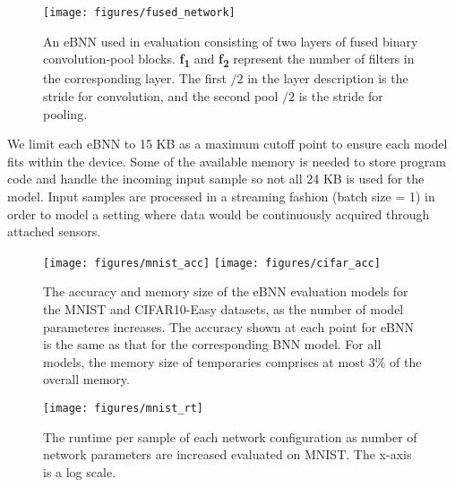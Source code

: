 \documentclass[10pt,emptycopyrightspace]{ewsn-proc}
\begin{document}
\begin{figure}
  \begin{minipage}[ht!]{0.25\linewidth}
    \texttt{[image: figures/fused\_network]}
  \end{minipage}\hfill
  \begin{minipage}[c]{0.7\linewidth}
    \caption{An eBNN used in evaluation consisting of two layers of fused binary convolution-pool blocks. \textbf{f\textsubscript{1}} and \textbf{f\textsubscript{2}} represent the number of filters in the corresponding layer. The first $/2$ in the layer description is the stride for convolution, and the second pool $/2$ is the stride for pooling.} \label{fig:fused_network}
  \end{minipage}
\end{figure}



We limit each eBNN to 15 KB as a maximum cutoff point to ensure each model fits within the device. Some of the available memory is needed to store program code and handle the incoming input sample so not all 24 KB is used for the model. Input samples are processed in a streaming fashion (batch size = 1) in order to model a setting where data would be continuously acquired through attached sensors.


\begin{figure*}[h]
\begin{minipage}[t]{.64\textwidth}
\texttt{[image: figures/mnist\_acc]}\hfill
\texttt{[image: figures/cifar\_acc]}

\caption{The accuracy and memory size of the eBNN evaluation models for the MNIST and CIFAR10-Easy datasets, as the number of model parameteres increases. The accuracy shown at each point for eBNN is the same as that for the corresponding BNN model. For all models, the memory size of temporaries comprises at most $3\%$ of the overall memory.}
\label{fig:accuracy_memory}
\end{minipage}
\hfill
\begin{minipage}[t]{.34\textwidth}
\texttt{[image: figures/mnist\_rt]}
\caption{The runtime per sample of each network configuration as number of network parameters are increased evaluated on MNIST. The x-axis is a log scale.}
  \label{fig:runtime}
\end{minipage}
\end{figure*}
\end{document}

